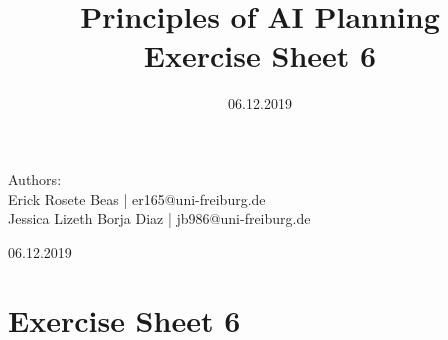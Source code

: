 \documentclass[12pt,a4paper]{article}
\title{\textbf{Principles of AI Planning
		\\{\Large Exercise Sheet 6}}}
\date{06.12.2019}
\begin{document}
\begin{flushleft}
	Authors:\\
	Erick Rosete Beas | er165@uni-freiburg.de\\
	Jessica Lizeth Borja Diaz | jb986@uni-freiburg.de\\
\end{flushleft}
{\let\newpage\relax\maketitle}
\begin{center} 
	\large 06.12.2019 
\end{center}

	\section*{Exercise Sheet 6}
\end{document}
